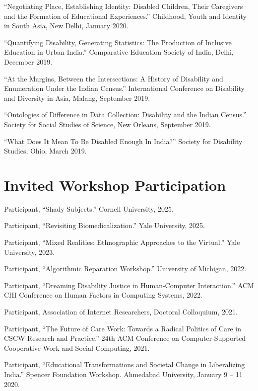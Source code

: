\documentclass[11pt,letterpaper]{report}
\newcommand{\listitemspace}{0.25em}
\renewenvironment{itemize}{\begin{list}{}{\setlength{\leftmargin}{0em}\setlength{\parskip}{0em}\setlength{\itemsep}{\listitemspace}\setlength{\parsep}{\listitemspace}}}{\end{list}}
\begin{document}
\begin{itemize}
        \item “Negotiating Place, Establishing Identity: Disabled Children, Their Caregivers and the Formation of Educational Experiences.” Childhood, Youth and Identity in South Asia, New Delhi, January 2020.
        \item “Quantifying Disability, Generating Statistics: The Production of Inclusive Education in Urban India.” Comparative Education Society of India, Delhi, December 2019.
        \item “At the Margins, Between the Intersections: A History of Disability and Enumeration Under the Indian Census.” International Conference on Disability and Diversity in Asia, Malang, September 2019.
        \item “Ontologies of Difference in Data Collection: Disability and the Indian Census.” Society for Social Studies of Science, New Orleans, September 2019.
        \item “What Does It Mean To Be Disabled Enough In India?” Society for Disability Studies, Ohio, March 2019.
    \end{itemize}

    \section*{Invited Workshop Participation}
    \begin{itemize}
        \item Participant, “Shady Subjects.” Cornell University, 2025.
        \item Participant, “Revisiting Biomedicalization.” Yale University, 2025.
        \item Participant, “Mixed Realities: Ethnographic Approaches to the Virtual.” Yale University, 2023.
        \item Participant, “Algorithmic Reparation Workshop.” University of Michigan, 2022.
        \item Participant, “Dreaming Disability Justice in Human-Computer Interaction.” ACM CHI Conference on Human Factors in Computing Systems, 2022.
        \item Participant, Association of Internet Researchers, Doctoral Colloquium, 2021.
        \item Participant, “The Future of Care Work: Towards a Radical Politics of Care in CSCW Research and Practice.” 24th ACM Conference on Computer-Supported Cooperative Work and Social Computing, 2021.
        \item Participant, “Educational Transformations and Societal Change in Liberalizing India.” Spencer Foundation Workshop. Ahmedabad University, January 9 – 11 2020.
    \end{itemize}
\end{document}
